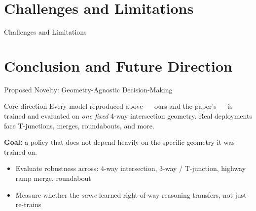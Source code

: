 \documentclass[aspectratio=169,10pt]{beamer}
\begin{document}
\section{Challenges and Limitations}

\begin{frame}{Challenges and Limitations}
\end{frame}

\section{Conclusion and Future Direction}

\begin{frame}{Proposed Novelty: Geometry-Agnostic Decision-Making}
    \begin{alertblock}{Core direction}
        Every model reproduced above --- ours and the paper's --- is trained and evaluated on \emph{one fixed} 4-way intersection geometry. Real deployments face T-junctions, merges, roundabouts, and more.
    \end{alertblock}
    \vspace{6pt}
    \textbf{Goal:} a policy that does not depend heavily on the specific geometry it was trained on.
    \begin{itemize}
        \item Evaluate robustness across: 4-way intersection, 3-way / T-junction, highway ramp merge, roundabout
        \item Measure whether the \emph{same} learned right-of-way reasoning transfers, not just re-trains
    \end{itemize}
\end{frame}
\end{document}
